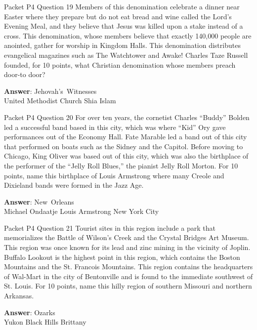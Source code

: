 \begin{frame}{Packet P4 Question 19}
Members of this denomination celebrate a dinner   near Easter where they prepare but do not eat bread and   wine called the Lord’s Evening Meal, and they believe that Jesus was killed upon a stake instead of a cross. This denomination, whose members believe that exactly   140,000 people are anointed, gather for worship in Kingdom Halls. This denomination   distributes evangelical magazines such as The Watchtower and Awake! Charles Taze Russell founded,     for 10 points, what Christian denomination whose members preach door-to door?

\textbf{Answer}: Jehovah's\ Witnesses\\
 United Methodist Church
 Shia Islam
\end{frame}

\begin{frame}{Packet P4 Question 20}
For over ten years, the cornetist Charles “Buddy” Bolden led a   successful band based   in this city, which was where “Kid” Ory gave performances out of the Economy Hall. Fate Marable led a band out of this city that performed on boats such as the Sidney and the Capitol. Before moving to Chicago, King Oliver was based out of   this city, which was   also the birthplace of the performer of the “Jelly Roll Blues,” the pianist Jelly Roll Morton. For 10 points, name this birthplace of Louis Armstrong where many Creole and Dixieland   bands were formed in the Jazz Age.  

\textbf{Answer}: New\ Orleans\\
 Michael Ondaatje
 Louis Armstrong
 New York City
\end{frame}

\begin{frame}{Packet P4 Question 21}
Tourist sites in this region include a park that memorializes the Battle of Wilson’s Creek and the Crystal Bridges Art Museum. This region was once known for its lead and zinc mining in the vicinity of   Joplin. Buffalo Lookout is the highest point   in this region, which contains the Boston Mountains and   the St. Francois Mountains.   This region   contains the headquarters of Wal-Mart in the city of Bentonville and is found to the immediate southwest of St. Louis. For 10 points, name this hilly region of southern Missouri and northern Arkansas.  

\textbf{Answer}: Ozarks\\
 Yukon
 Black Hills
 Brittany
\end{frame}

